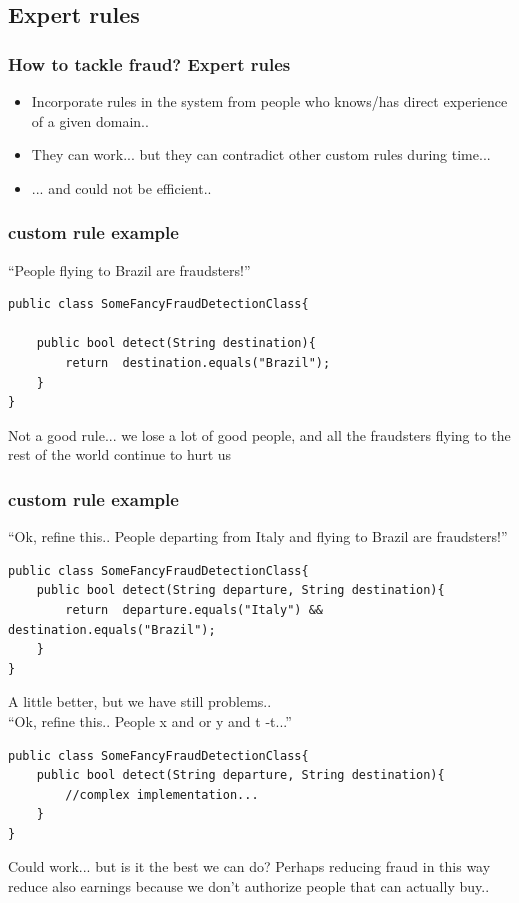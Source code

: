 \documentclass{beamer}
\begin{document}
\subsection{Expert rules}
\begin{frame}
  \frametitle{How to tackle fraud? Expert rules}
  \begin{itemize}
	\item<+-> Incorporate rules in the system from people who knows/has direct experience of a given domain..
	\item<+-> They can work... but they can contradict other custom rules during time... 
		\item<+-> ... and could not be efficient..
   \end{itemize}
\end{frame}


\begin{frame}[containsverbatim]
	\frametitle{custom rule example}
	``People flying to Brazil are fraudsters!''  \\
	\begin{lstlisting}
public class SomeFancyFraudDetectionClass{

	public bool detect(String destination){
		return 	destination.equals("Brazil");
	}
}
	\end{lstlisting}
	Not a good rule... we lose a lot of good people, and all the fraudsters flying to the rest of the world continue to hurt us 
\end{frame}

\begin{frame}[containsverbatim]
	\frametitle{custom rule example}
	``Ok, refine this.. People departing from Italy and flying to Brazil are fraudsters!''  \\
	\begin{lstlisting}
public class SomeFancyFraudDetectionClass{
	public bool detect(String departure, String destination){
		return 	departure.equals("Italy") && destination.equals("Brazil");
	}
}
	\end{lstlisting}
	A little better, but we have still problems.. \\
	
    ``Ok, refine this.. People x and or y and t -t...''  \\
	\begin{lstlisting}
public class SomeFancyFraudDetectionClass{
	public bool detect(String departure, String destination){
        //complex implementation...
	}
}
	\end{lstlisting}
	Could work... but is it the best we can do? Perhaps reducing fraud in this way reduce also earnings because we don't authorize people that can actually buy..  
\end{frame}
\end{document}
